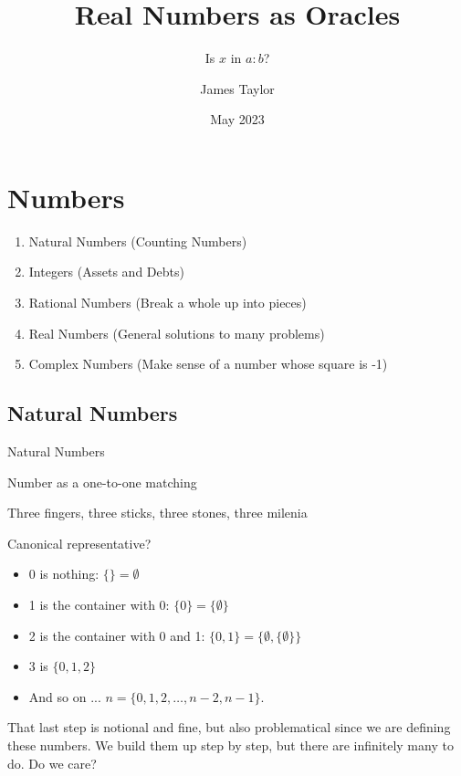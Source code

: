 \documentclass{beamer}
\title[Oracles]{Real Numbers as Oracles}
\subtitle{Is $x$ in $a:b$?}
\author{James Taylor}
\institute{ratmath.com}
\date{May 2023}
\begin{document}
\begin{frame}
\titlepage
\end{frame}


\section{Numbers}

\begin{frame}

\begin{enumerate}
\item Natural Numbers (Counting Numbers)
\item Integers (Assets and Debts)
\item Rational Numbers (Break a whole up into pieces)
\item Real Numbers (General solutions to many problems)
\item Complex Numbers (Make sense of a number whose square is -1)
\end{enumerate}

\end{frame}

\subsection{Natural Numbers}

\begin{frame}{Natural Numbers}

Number as a one-to-one matching

Three fingers, three sticks, three stones, three milenia

Canonical representative?

\pause

\begin{itemize}
    \item 0 is nothing:  $\{\} = \emptyset$
    \item 1 is the container with 0:  $\{0\} = \{\emptyset\}$
    \item 2 is the container with 0 and 1:  $\{0, 1\} = \{ \emptyset,\{\emptyset\} \}$
    \item 3 is $\{0, 1, 2\}$
    \item And so on ... $n = \{0, 1, 2, \ldots, n-2, n-1\}$. 
\end{itemize}

That last step is notional and fine, but also problematical since we are defining these numbers. We build them up step by step, but there are infinitely many to do. Do we care? 

\end{frame}
\end{document}
